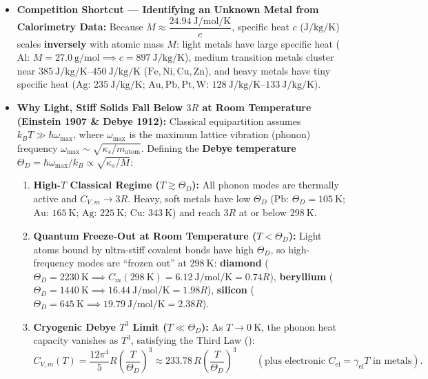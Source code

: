 \begin{itemize}
  \item \textbf{Competition Shortcut --- Identifying an Unknown Metal from Calorimetry Data:} Because $M \approx \dfrac{\SI{24.94}{\joule\per\mole\per\kelvin}}{c}$, specific heat $c$ ($\si{\joule\per\kilogram\per\kelvin}$) scales \textbf{inversely} with atomic mass $M$: light metals have large specific heat ($\mathrm{Al}$: $M = \SI{27.0}{\gram\per\mole} \implies c = \SI{897}{\joule\per\kilogram\per\kelvin}$), medium transition metals cluster near $\SIrange{385}{450}{\joule\per\kilogram\per\kelvin}$ ($\mathrm{Fe}, \mathrm{Ni}, \mathrm{Cu}, \mathrm{Zn}$), and heavy metals have tiny specific heat ($\mathrm{Ag}$: $\SI{235}{\joule\per\kilogram\per\kelvin}$; $\mathrm{Au}, \mathrm{Pb}, \mathrm{Pt}, \mathrm{W}$: $\SIrange{128}{133}{\joule\per\kilogram\per\kelvin}$).
  \item \textbf{Why Light, Stiff Solids Fall Below $3R$ at Room Temperature (Einstein 1907 \& Debye 1912):} Classical equipartition assumes $k_B T \gg \hbar\omega_{\max}$, where $\omega_{\max}$ is the maximum lattice vibration (phonon) frequency $\omega_{\max} \sim \sqrt{\kappa_s/m_{\mathrm{atom}}}$. Defining the \textbf{Debye temperature} $\Theta_D = \hbar\omega_{\max}/k_B \propto \sqrt{\kappa_s/M}$:
  \begin{enumerate}
    \item \textbf{High-$T$ Classical Regime ($T \gtrsim \Theta_D$):} All phonon modes are thermally active and $C_{V,m} \to 3R$. Heavy, soft metals have low $\Theta_D$ ($\mathrm{Pb}$: $\Theta_D = \SI{105}{\kelvin}$; $\mathrm{Au}$: $\SI{165}{\kelvin}$; $\mathrm{Ag}$: $\SI{225}{\kelvin}$; $\mathrm{Cu}$: $\SI{343}{\kelvin}$) and reach $3R$ at or below $\SI{298}{\kelvin}$.
    \item \textbf{Quantum Freeze-Out at Room Temperature ($T < \Theta_D$):} Light atoms bound by ultra-stiff covalent bonds have high $\Theta_D$, so high-frequency modes are ``frozen out'' at $\SI{298}{\kelvin}$: \textbf{diamond} ($\Theta_D = \SI{2230}{\kelvin} \implies C_m(\SI{298}{\kelvin}) = \SI{6.12}{\joule\per\mole\per\kelvin} = 0.74R$), \textbf{beryllium} ($\Theta_D = \SI{1440}{\kelvin} \implies \SI{16.44}{\joule\per\mole\per\kelvin} = 1.98R$), \textbf{silicon} ($\Theta_D = \SI{645}{\kelvin} \implies \SI{19.79}{\joule\per\mole\per\kelvin} = 2.38R$).
    \item \textbf{Cryogenic Debye $T^3$ Limit ($T \ll \Theta_D$):} As $T \to \SI{0}{\kelvin}$, the phonon heat capacity vanishes as $T^3$, satisfying the Third Law ():
    \begin{equation}\label{eq:04:debye}
      C_{V,m}(T) = \frac{12\pi^4}{5}R\left(\frac{T}{\Theta_D}\right)^3 \approx 233.78\,R\left(\frac{T}{\Theta_D}\right)^3 \qquad (\text{plus electronic } C_{\mathrm{el}} = \gamma_{\mathrm{el}}T \text{ in metals}).
    \end{equation}
  \end{enumerate}
\end{itemize}

